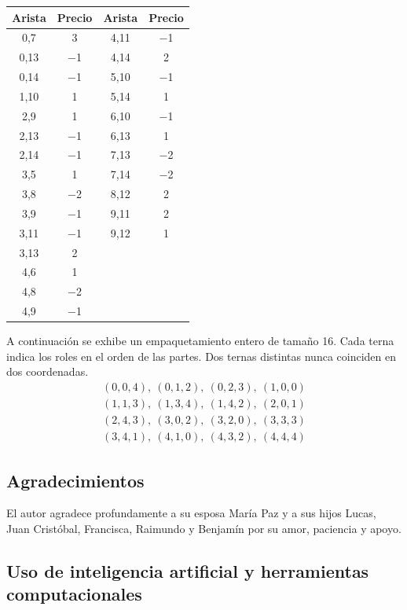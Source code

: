 \documentclass[spanish,11pt,a4paper]{article}
\begin{document}
\begin{center}
\begin{tabular}{cccc}
\toprule
Arista & Precio & Arista & Precio \\
\midrule
0,7 & 3 & 4,11 & $-$1 \\
0,13 & $-$1 & 4,14 & 2 \\
0,14 & $-$1 & 5,10 & $-$1 \\
1,10 & 1 & 5,14 & 1 \\
2,9 & 1 & 6,10 & $-$1 \\
2,13 & $-$1 & 6,13 & 1 \\
2,14 & $-$1 & 7,13 & $-$2 \\
3,5 & 1 & 7,14 & $-$2 \\
3,8 & $-$2 & 8,12 & 2 \\
3,9 & $-$1 & 9,11 & 2 \\
3,11 & $-$1 & 9,12 & 1 \\
3,13 & 2 &  &  \\
4,6 & 1 &  &  \\
4,8 & $-$2 &  &  \\
4,9 & $-$1 &  &  \\
\bottomrule
\end{tabular}
\end{center}

A continuación se exhibe un empaquetamiento entero de tamaño 16. Cada terna indica los roles en el orden de las partes. Dos ternas distintas nunca coinciden en dos coordenadas.
\[\begin{gathered}
(0,0,4),\ (0,1,2),\ (0,2,3),\ (1,0,0)\\
(1,1,3),\ (1,3,4),\ (1,4,2),\ (2,0,1)\\
(2,4,3),\ (3,0,2),\ (3,2,0),\ (3,3,3)\\
(3,4,1),\ (4,1,0),\ (4,3,2),\ (4,4,4)
\end{gathered}\]

\subsection{Agradecimientos}\label{agradecimientos}

El autor agradece profundamente a su esposa María Paz y a sus hijos Lucas, Juan Cristóbal, Francisca, Raimundo y Benjamín por su amor, paciencia y apoyo.

\subsection{Uso de inteligencia artificial y herramientas computacionales}\label{uso-de-inteligencia-artificial-y-herramientas-computacionales}
\end{document}
